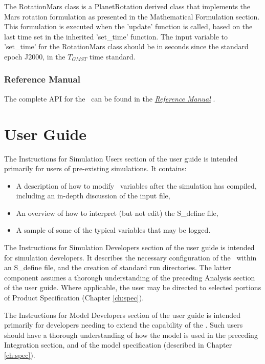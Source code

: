 The RotationMars class is a PlanetRotation derived class that implements the
Mars rotation formulation as presented in the Mathematical Formulation
section. This formulation is executed when the 'update' function is called,
based on the last time set in the inherited 'set\_time' function. The input
variable to 'set\_time' for the RotationMars class should be in seconds
since the standard epoch J2000, in the $T_{GMST}$ time standard.

\subsection{Reference Manual}

The complete API for the \ModelDesc\ can be found
in the  \href{file:refman.pdf} {\em Reference Manual}
\cite{RNPbib:ReferenceManual}.

\clearpage
\boilerplateinventory

\chapter{User Guide}\label{ch:user}
The Instructions for Simulation Users section of the user guide is intended
primarily for users of pre-existing simulations. It contains: 
\begin{itemize}
\item A description of how to modify \ModelDesc\ variables after the simulation 
has compiled, including an in-depth discussion of the input file,
\item An overview of how to interpret (but not edit) the S\_define file,
\item A sample of some of the typical variables that may be logged.
\end{itemize}

The Instructions for Simulation Developers section of the user guide is intended
for simulation developers. It describes the necessary configuration of the
\ModelDesc\ within an S\_define file, and the creation of standard run
directories.  The latter component assumes a thorough understanding of the
preceding Analysis section of the user guide. Where applicable, the user may be
directed to selected portions of Product Specification (Chapter \ref{ch:spec}).

The Instructions for Model Developers section of the user guide is intended
primarily for developers needing to extend the capability of the \ModelDesc.
Such users should have a thorough understanding of how the model is used in
the preceding Integration section, and of the model specification
(described in Chapter \ref{ch:spec}).

